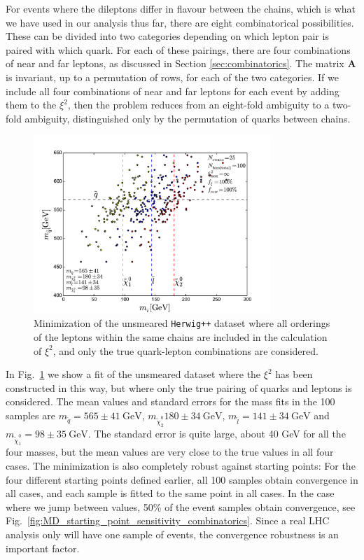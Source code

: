 \documentclass[twoside,english]{uiofysmaster}
\begin{document}
For events where the dileptons differ in flavour between the chains, which is what we have used in our analysis thus far, there are eight combinatorical possibilities. These can be divided into two categories depending on which lepton pair is paired with which quark. For each of these pairings, there are four combinations of near and far leptons, as discussed in Section \ref{sec:combinatorics}. The matrix $\mathbf{A}$ is invariant, up to a permutation of rows, for each of the two categories. If we include all four combinations of near and far leptons for each event by adding them to the $\xi^2$, then the problem reduces from an eight-fold ambiguity to a two-fold ambiguity, distinguished only by the permutation of quarks between chains. 
\begin{figure}[hbt]
	\centering
	\includegraphics[width=0.8\textwidth]{figures/improving_combinatorics/herwigpp-4combosum-fit-nocomb-nosmear-nocut.pdf} 
	\caption{Minimization of the unsmeared {\tt Herwig++} dataset where all orderings of the leptons within the same chains are included in the calculation of $\xi^2$, and only the true quark-lepton combinations are considered.}
	\label{fig:4combosum_nocomb-nosmear}
\end{figure}

In Fig.\ \ref{fig:4combosum_nocomb-nosmear} we show a fit of the unsmeared dataset where the $\xi^2$ has been constructed in this way, but where only the true pairing of quarks and leptons is considered. The mean values and standard errors for the mass fits in the 100 samples are $m_{\tilde q} = 565 \pm 41~\mathrm{GeV}$, $m_{\tilde \chi_2^0} 180 \pm 34~\mathrm{GeV}$, $m_{\tilde l} = 141 \pm 34~\mathrm{GeV}$ and $m_{\tilde \chi_1^0} = 98 \pm 35~\mathrm{GeV}$. The standard error is quite large, about 40 GeV for all the four masses, but the mean values are very close to the true values in all four cases. The minimization is also completely robust against starting points: For the four different starting points defined earlier, all 100 samples obtain convergence in all cases, and each sample is fitted to the same point in all cases. In the case where we jump between values, 50\% of the event samples obtain convergence, see Fig.\ \ref{fig:MD_starting_point_sensitivity_combinatorics}. Since a real LHC analysis only will have one sample of events, the convergence robustness is an important factor. 
\end{document}
